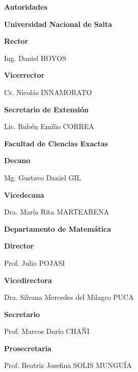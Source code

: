 \begin{center}
	\LARGE \bfseries \sffamily Autoridades
\end{center}

\begin{center}
	\sffamily \Large \bfseries Universidad Nacional de Salta

	\bigskip
	
	\sffamily \large \bfseries Rector
	
	\normalfont \large
	Ing. Daniel HOYOS
	
	\bigskip
	
	\sffamily \large \bfseries Vicerrector
	
	\normalfont \large
	Cr. Nicolás INNAMORATO
	
	\bigskip
	
	\sffamily \large \bfseries Secretario de Extensión 
	
	\normalfont \large
	Lic. Rubén Emilio CORREA
\end{center}

\vspace*{5mm}

\begin{center}
	\sffamily \Large \bfseries Facultad de Ciencias Exactas
	
	\bigskip
	
	\sffamily \large \bfseries Decano
	
	\normalfont \large
	Mg. Gustavo Daniel GIL
	
	\bigskip
	
	\sffamily \large \bfseries Vicedecana
	
	\normalfont \large
	Dra. María Rita MARTEARENA
\end{center}

\vspace*{5mm}

\begin{center}
	\sffamily \Large \bfseries Departamento de Matemática
	
	\bigskip
	
	\sffamily \large \bfseries Director
	
	\normalfont \large
	Prof. Julio POJASI
	
	\bigskip
	
	\sffamily \large \bfseries Vicedirectora
	
	\normalfont \large
	Dra. Silvana Mercedes del Milagro PUCA
	
	\bigskip
	
	\sffamily \large \bfseries Secretario
	
	\normalfont \large
	Prof. Marcos Darío CHAÑI
	
	\bigskip
	
	\sffamily \large \bfseries Prosecretaria
	
	\normalfont \large
	Prof. Beatriz Josefina SOLIS MUNGUÍA
\end{center}